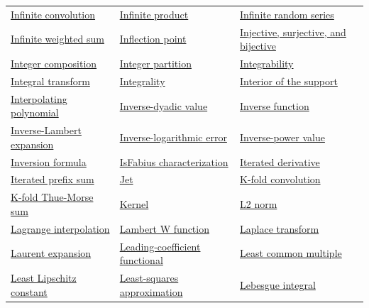\documentclass[11pt,oneside]{article}
\begin{document}
\begin{longtable}{p{}p{}p{}}
\hyperlink{gls:infinite-convolution}{Infinite convolution} & \hyperlink{gls:infinite-product}{Infinite product} & \hyperlink{gls:infinite-random-series}{Infinite random series} \\
\hyperlink{gls:infinite-weighted-sum}{Infinite weighted sum} & \hyperlink{gls:inflection-point}{Inflection point} & \hyperlink{gls:injective-surjective-bijective}{Injective, surjective, and bijective} \\
\hyperlink{gls:integer-composition}{Integer composition} & \hyperlink{gls:integer-partition}{Integer partition} & \hyperlink{gls:integrability}{Integrability} \\
\hyperlink{gls:integral-transform}{Integral transform} & \hyperlink{gls:integrality}{Integrality} & \hyperlink{gls:interior-support}{Interior of the support} \\
\hyperlink{gls:interpolating-polynomial}{Interpolating polynomial} & \hyperlink{gls:inverse-dyadic-value}{Inverse-dyadic value} & \hyperlink{gls:inverse-function}{Inverse function} \\
\hyperlink{gls:inverse-lambert-expansion}{Inverse-Lambert expansion} & \hyperlink{gls:inverse-logarithmic-error}{Inverse-logarithmic error} & \hyperlink{gls:inverse-power-value}{Inverse-power value} \\
\hyperlink{gls:inversion-formula}{Inversion formula} & \hyperlink{gls:fabius-isfabius-characterization}{IsFabius characterization} & \hyperlink{gls:iterated-derivative}{Iterated derivative} \\
\hyperlink{gls:iterated-prefix-sum}{Iterated prefix sum} & \hyperlink{gls:jet}{Jet} & \hyperlink{gls:k-fold-convolution}{K-fold convolution} \\
\hyperlink{gls:k-fold-thue-morse-sum}{K-fold Thue-Morse sum} & \hyperlink{gls:kernel}{Kernel} & \hyperlink{gls:l2-norm}{L2 norm} \\
\hyperlink{gls:lagrange-interpolation}{Lagrange interpolation} & \hyperlink{gls:lambert-w-function}{Lambert W function} & \hyperlink{gls:laplace-transform}{Laplace transform} \\
\hyperlink{gls:laurent-expansion}{Laurent expansion} & \hyperlink{gls:leading-coefficient-functional}{Leading-coefficient functional} & \hyperlink{gls:least-common-multiple}{Least common multiple} \\
\hyperlink{gls:least-lipschitz-constant}{Least Lipschitz constant} & \hyperlink{gls:least-squares-approximation}{Least-squares approximation} & \hyperlink{gls:lebesgue-integral}{Lebesgue integral} \\

\end{longtable}
\end{document}

